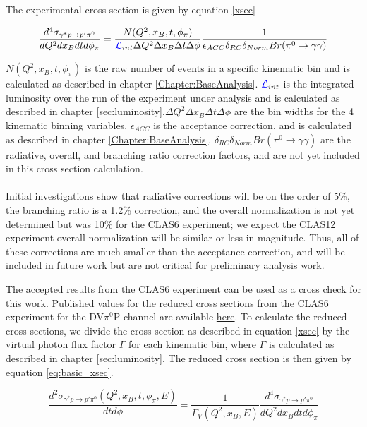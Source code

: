 
The experimental cross section is given by equation \ref{xsec}

 \begin{equation}\label{xsec}
     \frac{d^4\sigma_{\gamma^*p \rightarrow p'\pi^0}}{dQ^2dx_Bdtd\phi_{\pi}} = \frac{N(Q^2,x_B,t,\phi_{\pi})}{\textcolor{blue}{ \mathcal{L}}_{int}\Delta Q^2\Delta x_B\Delta t\Delta \phi} \frac{1}{\epsilon_{ACC} \delta_{RC} \delta_{Norm} Br(\pi^0 \rightarrow \gamma \gamma)}
\end{equation}

$N(Q^2,x_B,t,\phi_{\pi})$ is the raw number of events in a specific kinematic bin and is calculated as described in chapter \ref{Chapter:BaseAnalysis}. $\textcolor{blue}{ \mathcal{L}}_{int}$ is the integrated luminosity over the run of the experiment under analysis and is calculated as described in chapter \ref{sec:luminosity}.$\Delta Q^2\Delta x_B\Delta t\Delta \phi$ are the bin widths for the 4 kinematic binning variables. $\epsilon_{ACC}$ is the acceptance correction, and is calculated as described in chapter \ref{Chapter:BaseAnalysis}. $\delta_{RC} \delta_{Norm} Br(\pi^0 \rightarrow \gamma \gamma)$ are the radiative, overall, and branching ratio correction factors, and are not yet included in this cross section calculation. 
\\~\\
Initial investigations show that radiative corrections will be on the order of 5\%, the branching ratio is a 1.2\% correction, and the overall normalization is not yet determined but was 10\% for the CLAS6 experiment; we expect the CLAS12 experiment overall normalization will be similar or less in magnitude. Thus, all of these corrections are much smaller than the acceptance correction, and will be included in future work but are not critical for preliminary analysis work.

The accepted results from the CLAS6 experiment \cite{Bedlinskiy2014ExclusiveCLAS} can be used as a cross check for this work. Published values for the reduced cross sections from the CLAS6 experiment for the DV$\pi^0$P channel are available \href{https://journals.aps.org/prc/supplemental/10.1103/PhysRevC.90.025205}{here}. To calculate the reduced cross sections, we divide the cross section as described in equation \ref{xsec} by the virtual photon flux factor $\Gamma$ for each kinematic bin, where $\Gamma$ is calculated as described in chapter \ref{sec:luminosity}. The reduced cross section is then given by equation \ref{eq:basic_xsec}.

 \begin{equation}\label{xsec_red}
    \frac{d^2\sigma_{\gamma^*p \rightarrow p'\pi^0}(Q^2,x_B,t,\phi_{\pi},E)}{dtd\phi} = \frac{1}{\Gamma_V(Q^2,x_B,E)} \frac{d^4\sigma_{\gamma^*p \rightarrow p'\pi^0}}{dQ^2dx_Bdtd\phi_{\pi}}
\end{equation}


